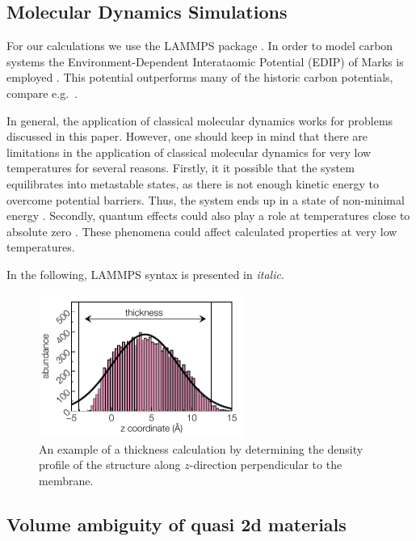 \documentclass[preprint,12pt]{elsarticle}
\begin{document}
\subsection{Molecular Dynamics Simulations}

For our calculations we use the LAMMPS package \cite{TAB:CPC22}. In order to model carbon systems 
the Environment-Dependent Interataomic Potential (EDIP) of Marks is employed \cite{Mar:PRB00}. 
This potential outperforms many of the historic carbon 
potentials, compare e.g.\ \cite{GEH:PE18,TAJ:C19}. 

In general, the application of classical molecular dynamics works for problems discussed in this paper. 
However, one should keep in mind that there are limitations in the application of classical molecular dynamics
for very low temperatures for several reasons. Firstly, it it possible that the system equilibrates 
into metastable states, as there is not enough kinetic energy to overcome potential barriers. 
Thus, the system ends up in a state of non-minimal energy \cite{KaP:N90}. 
Secondly, quantum effects could also play a role at temperatures close to absolute zero \cite{FrS:2001}. 
These phenomena could affect calculated properties at very low temperatures.

In the following, LAMMPS syntax is presented in \textit{italic}.


\begin{figure}[ht!]
\centering
\includegraphics[width=0.6\textwidth]{YM4CNM-f-1.pdf}
\caption{An example of a thickness calculation by determining 
the density profile of the structure along $z$-direction perpendicular 
to the membrane. \label{zdensity}}
\end{figure}
 
\subsection{Volume ambiguity of quasi 2d materials}
\label{sec-2-1}
\end{document}
